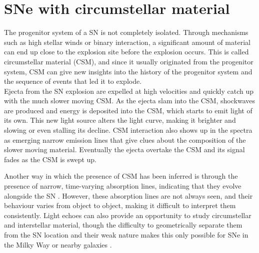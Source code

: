 \documentclass[a4paper,oneside,12pt, class=Latex/Classes/PhDthesisPSnPDF, crop=false]{standalone}
\begin{document}
\section{SNe with circumstellar material}
The progenitor system of a SN is not completely isolated. Through mechanisms such as high stellar winds or binary interaction, a significant amount of material can end up close to the explosion site before the explosion occurs. This is called circumstellar material (CSM), and since it usually originated from the progenitor system, CSM can give new insights into the history of the progenitor system and the sequence of events that led it to explode.\\

Ejecta from the SN explosion are expelled at high velocities and quickly catch up with the much slower moving CSM. As the ejecta slam into the CSM, shockwaves are produced and energy is deposited into the CSM, which starts to emit light of its own. This new light source alters the light curve, making it brighter and slowing or even stalling its decline. CSM interaction also shows up in the spectra as emerging narrow emission lines that give clues about the composition of the slower moving material. Eventually the ejecta overtake the CSM and its signal fades as the CSM is swept up.

Another way in which the presence of CSM has been inferred is through the presence of narrow, time-varying absorption lines, indicating that they evolve alongside the SN \citep[e.g.,][]{2006X, Sternberg_NaID}. However, these absorption lines are not always seen, and their behaviour varies from object to object, making it difficult to interpret them consistently. Light echoes can also provide an opportunity to study circumstellar and interstellar material, though the difficulty to geometrically separate them from the SN location and their weak nature makes this only possible for SNe in the Milky Way or nearby galaxies \citep{Patat_light_echoes, Tycho_Brahe_classif, 2012cg}.
\end{document}

